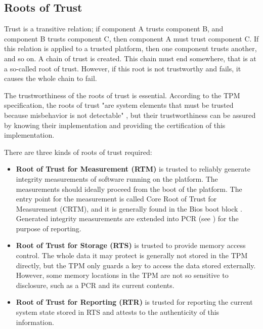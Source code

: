\subsection{Roots of Trust}
Trust is a transitive relation; if component A trusts component B, and component B trusts component C, then component A must trust component C. If this relation is applied to a trusted platform, then one component trusts another, and so on. A chain of trust is created. This chain must end somewhere, that is at a so-called root of trust. However, if this root is not trustworthy and fails, it causes the whole chain to fail.

The trustworthiness of the roots of trust is essential. According to the TPM specification, the roots of trust "are system elements that must be trusted because misbehavior is not detectable" \cite[p.~23]{tcg_p1_architecture}, but their trustworthiness can be assured by knowing their implementation and providing the certification of this implementation.

There are three kinds of roots of trust required:
\begin{itemize}
    \item \textbf{Root of Trust for Measurement (RTM)} is trusted to reliably generate integrity measurements of software running on the platform. The measurements should ideally proceed from the boot of the platform. The entry point for the measurement is called Core Root of Trust for Measurement (CRTM), and it is generally found in the Bios boot block \cite[p.~185]{Tomlinson2017}. Generated integrity measurements are extended into PCR (see ) for the purpose of reporting.
    \item \textbf{Root of Trust for Storage (RTS)} is trusted to provide memory access control. The whole data it may protect is generally not stored in the TPM directly, but the TPM only guards a key to access the data stored externally. However, some memory locations in the TPM are not so sensitive to disclosure, such as a PCR and its current contents. 
    \item \textbf{Root of Trust for Reporting (RTR)} is trusted for reporting the current system state stored in RTS and attests to the authenticity of this information.
\end{itemize}

